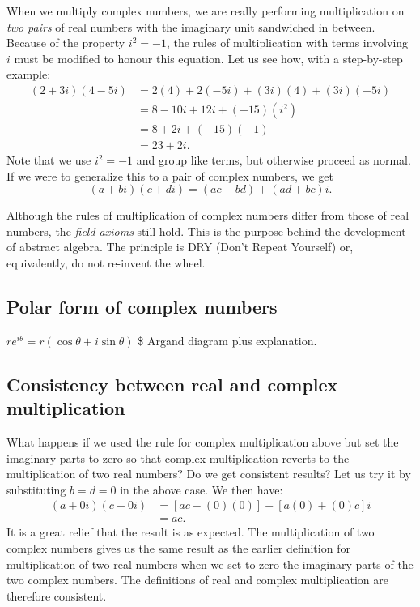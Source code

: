\documentclass[
  a4paper,
]{article}
\begin{document}
When we multiply complex numbers, we are really performing
multiplication on \emph{two pairs} of real numbers with the imaginary
unit sandwiched in between. Because of the property \(i^2 = -1\), the
rules of multiplication with terms involving \(i\) must be modified to
honour this equation. Let us see how, with a step-by-step example: \[
\begin{aligned}
(2 + 3i)(4 - 5i) & = 2(4) + 2(-5i) + (3i)(4) + (3i)(-5i)\\
& = 8 - 10i + 12i + (-15)(i^2)\\
& = 8 + 2i + (-15)(-1)\\
& = 23 + 2i.
\end{aligned}
\] Note that we use \(i^2 = -1\) and group like terms, but otherwise
proceed as normal. If we were to generalize this to a pair of complex
numbers, we get \[(a + bi)(c + di) = (ac - bd) + (ad + bc)i.\]

Although the rules of multiplication of complex numbers differ from
those of real numbers, the \emph{field axioms} still hold. This is the
purpose behind the development of abstract algebra. The principle is DRY
(Don't Repeat Yourself) or, equivalently, do not re-invent the wheel.

\hypertarget{polar-form-of-complex-numbers}{%
\subsection{Polar form of complex
numbers}\label{polar-form-of-complex-numbers}}

\(re^{i\theta} = r(\cos\theta + i\sin\theta)\) \$ Argand diagram plus
explanation.

\hypertarget{consistency-between-real-and-complex-multiplication}{%
\subsection{Consistency between real and complex
multiplication}\label{consistency-between-real-and-complex-multiplication}}

What happens if we used the rule for complex multiplication above but
set the imaginary parts to zero so that complex multiplication reverts
to the multiplication of two real numbers? Do we get consistent results?
Let us try it by substituting \(b = d = 0\) in the above case. We then
have: \[
\begin{aligned}
(a + 0i)(c + 0i) & = [ac - (0)(0)] + [a(0) + (0)c]i\\
& = ac.
\end{aligned}
\] It is a great relief that the result is as expected. The
multiplication of two complex numbers gives us the same result as the
earlier definition for multiplication of two real numbers when we set to
zero the imaginary parts of the two complex numbers. The definitions of
real and complex multiplication are therefore consistent.
\end{document}
